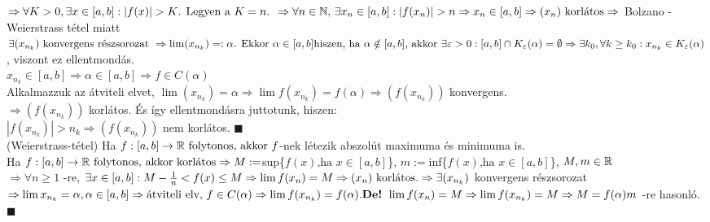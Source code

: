 \documentclass[a4paper,11pt]{article}
\begin{document}
$\Rightarrow \forall K>0, \exists x \in [a,b]: |f(x)|> K \text{. Legyen a } K = n \text{. } \Rightarrow \forall n \in \N \text{, } \exists x_n \in [a,b]: |f(x_n)| > n \\[0.1cm] \Rightarrow x_n \in [a,b] \Rightarrow (x_n) \text{ korlátos} \Rightarrow $ Bolzano - Weierstrass tétel miatt \\[0.1cm] $  \exists (x_{n_k}) \text{ konvergens részsorozat } \Rightarrow \lim(x_{n_k}) =: \alpha \text{. Ekkor } \alpha \in [a,b] \\[0.1cm] \text{hiszen, ha } \alpha \notin [a,b] \text{, akkor } \exists \varepsilon > 0: [a,b] \cap K_\varepsilon (\alpha) = \emptyset \\[0.1cm] \Rightarrow \exists k_0 , \forall k \geq k_0: x_{n_k} \in K_\varepsilon (\alpha) $, viszont ez ellentmondás. \\[0.1cm] $ x_{n_k} \in [a,b] \Rightarrow \alpha \in [a,b] \Rightarrow f \in C(\alpha) $ \\[0.1cm] Alkalmazzuk az átviteli elvet, $ \lim(x_{n_k}) = \alpha \Rightarrow \lim f(x_{n_k}) = f(\alpha) \Rightarrow (f (x_{n_k})) $ konvergens. \\[0.1cm] $ \Rightarrow (f (x_{n_k}))$ korlátos. És így ellentmondásra juttotunk, hiszen: \\[0.1cm] $ |f (x_{n_k})| > n_k \Rightarrow (f (x_{n_k}))$ nem korlátos. $\blacksquare$\\[0.4cm]
\tetel (Weierstrass-tétel) Ha $ f:[a,b]\to\mathbb{R}\text{ folytonos, akkor } f$-nek létezik abszolút maximuma és minimuma is.\\[0.1cm]
\biz Ha $ f:[a,b]\to\mathbb{R}\text{ folytonos, akkor korlátos} \\[0.1cm] \Rightarrow M := $sup\{$f(x)\text{,ha } x \in [a,b]$\}, $m := $inf\{$f(x)\text{,ha } x \in [a,b]$\}, $M,m \in \mathbb{R}$\\[0.1cm] $\Rightarrow \forall n \geq 1$ -re, $\exists x \in [a,b]: M - \frac{1}{n} < f(x) \leq M\\[0.1cm] \Rightarrow \lim f(x_n) = M\Rightarrow (x_n)\text{ korlátos.}\\[0.1cm] \Rightarrow \exists (x_{n_k}) $ konvergens részsorozat$ \Rightarrow \lim x_{n_k} = \alpha, \alpha \in [a,b] \Rightarrow \text{átviteli elv, } f \in C(\alpha)\\[0.1cm] \Rightarrow \lim f(x_{n_k}) = f (\alpha). \\[0.1cm] \text{\textbf{De!} } \lim f(x_n) = M \Rightarrow \lim f (x_{n_k}) = M \Rightarrow M = f(\alpha) \\[0.1cm] m$ -re hasonló. $\blacksquare$
\end{document}
